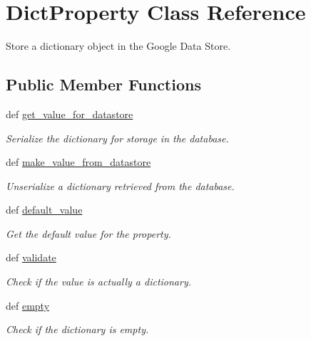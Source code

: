 \hypertarget{classbackend_1_1_dict_property}{
\section{DictProperty Class Reference}
\label{classbackend_1_1_dict_property}
}


Store a dictionary object in the Google Data Store.  


\subsection*{Public Member Functions}
\begin{DoxyCompactItemize}
\item 
def \hyperlink{classbackend_1_1_dict_property_a54cc138e6df3ad55c38fa5db72327963}{get\_\-value\_\-for\_\-datastore}
\begin{DoxyCompactList}\small\item\em Serialize the dictionary for storage in the database. \item\end{DoxyCompactList}\item 
def \hyperlink{classbackend_1_1_dict_property_a464c5a5f52df989128b5fc067ea34512}{make\_\-value\_\-from\_\-datastore}
\begin{DoxyCompactList}\small\item\em Unserialize a dictionary retrieved from the database. \item\end{DoxyCompactList}\item 
def \hyperlink{classbackend_1_1_dict_property_a64bfffc058d933b3b0599f5bc7c049d1}{default\_\-value}
\begin{DoxyCompactList}\small\item\em Get the default value for the property. \item\end{DoxyCompactList}\item 
def \hyperlink{classbackend_1_1_dict_property_a8f3dc5c8aaf85c281c2f52cda259aa56}{validate}
\begin{DoxyCompactList}\small\item\em Check if the value is actually a dictionary. \item\end{DoxyCompactList}\item 
def \hyperlink{classbackend_1_1_dict_property_aad7084fad37d1cf9b41a738ecfbbd249}{empty}
\begin{DoxyCompactList}\small\item\em Check if the dictionary is empty. \item\end{DoxyCompactList}\end{DoxyCompactItemize}
